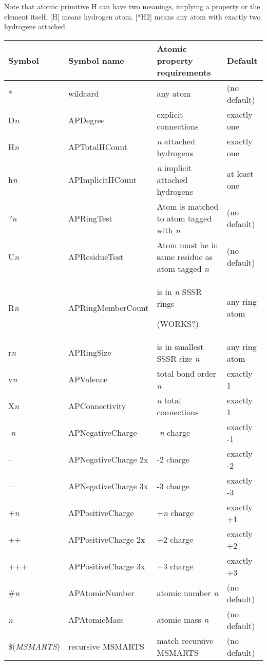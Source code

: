 \begin{itemize}
   Note that atomic primitive H can have two meanings, implying a property or the element itself. [H] means hydrogen atom. [*H2] means any atom with exactly two hydrogens attached
   
   	\begin{tabular}{| l | l | l | l |}
	\hline
	Symbol & Symbol name & Atomic property requirements & Default \\ \hline
	* & wildcard & any atom & (no default) \\ \hline
	D\emph{n} & APDegree & explicit connections & exactly one \\ \hline
	H\emph{n} & APTotalHCount& \emph{n} attached hydrogens & exactly one \\ \hline
	h\emph{n} & APImplicitHCount& \emph{n} implicit attached hydrogens & at least one\\ \hline
	?\emph{n} & APRingTest& Atom is matched to atom tagged with \emph{n}& (no default)\\ \hline
	U\emph{n} & APResidueTest& Atom must be in same residue as atom tagged \emph{n}& (no default)\\ \hline
	R\emph{n} & APRingMemberCount & is in \emph{n} SSSR rings \par(WORKS?)& any ring atom\\ \hline
	r\emph{n} & APRingSize & is in smallest SSSR size \emph{n} & any ring atom\\ \hline
	v\emph{n} & APValence & total bond order \emph{n} & exactly 1 \\ \hline
	X\emph{n} & APConnectivity& \emph{n} total connections & exactly 1 \\ \hline
	-\emph{n} & APNegativeCharge & -\emph{n} charge & exactly -1 \\ \hline
	-- & APNegativeCharge 2x & -2 charge & exactly -2 \\ \hline
	--- & APNegativeCharge 3x & -3 charge & exactly -3 \\ \hline
	+\emph{n} & APPositiveCharge & +\emph{n} charge & exactly +1 \\ \hline
	++ & APPositiveCharge 2x & +2 charge & exactly +2 \\ \hline
	+++ & APPositiveCharge 3x & +3 charge & exactly +3 \\ \hline
	\#\emph{n} & APAtomicNumber & atomic number \emph{n} & (no default) \\ \hline
	\emph{n} & APAtomicMass & atomic mass \emph{n} & (no default) \\ \hline
	\$(\emph{\tiny MSMARTS}) & recursive MSMARTS & match recursive MSMARTS & (no default) \\ \hline
\end{tabular}


\end{itemize}
